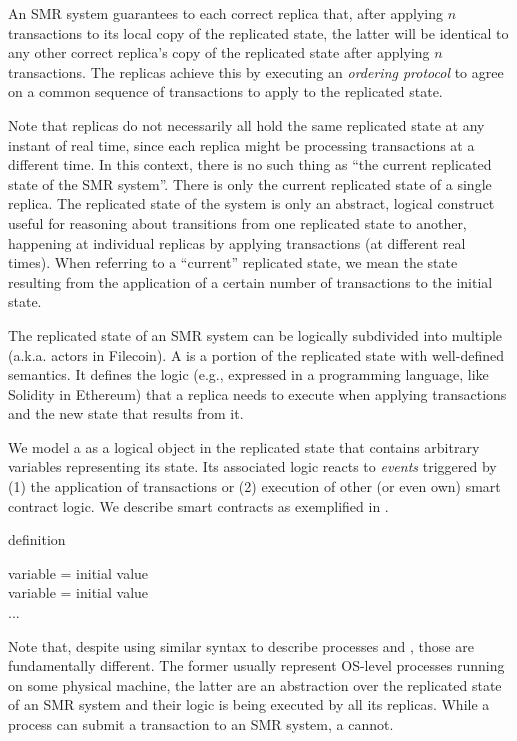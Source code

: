 An SMR system guarantees to each correct replica that, after applying $n$ transactions to its local copy of the replicated state,
the latter will be identical to any other correct replica’s copy of the replicated state after applying $n$ transactions.
The replicas achieve this by executing an \emph{ordering protocol} to agree on a common sequence of transactions to apply to the replicated state.

Note that replicas do not necessarily all hold the same replicated state at any instant of real time,
since each replica might be processing transactions at a different time.
In this context, there is no such thing as “the current replicated state of the SMR system”.
There is only the current replicated state of a single replica.
The replicated state of the system is only an abstract, logical construct
useful for reasoning about transitions from one replicated state to another,
happening at individual replicas by applying transactions (at different real times).
When referring to a “current” replicated state, we mean the state resulting from the application of a certain number of transactions to the initial state.

The replicated state of an SMR system can be logically subdivided into multiple \emph{\dapps} (a.k.a. actors in Filecoin).
A \dapp is a portion of the replicated state with well-defined semantics.
It defines the logic (e.g., expressed in a programming language, like Solidity in Ethereum)
that a replica needs to execute when applying transactions and the new state that results from it.

We model a \dapp as a logical object in the replicated state that contains arbitrary variables representing its state.
Its associated logic reacts to \emph{events} triggered by (1) the application of transactions or (2) execution of other (or even own) smart contract logic. We describe smart contracts as exemplified in .

\begin{algorithm}[H]
\footnotesize
\caption{\dapp definition}\label{alg:dapp-definition}
  \DontPrintSemicolon
  variable = initial value\\
  variable = initial value\\
  ...\\
\end{algorithm}
Note that, despite using similar syntax to describe processes and \dapps, those are fundamentally different.
The former usually represent OS-level processes running on some physical machine,
the latter are an abstraction over the replicated state of an SMR system and their logic is being executed by all its replicas.
While a process can submit a transaction to an SMR system, a \dapp cannot.

